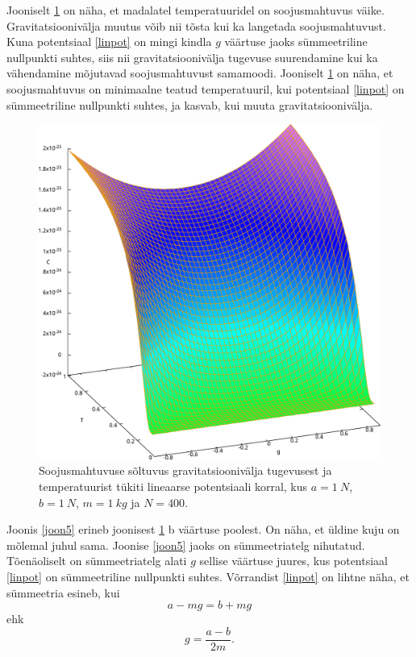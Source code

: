 \documentclass{trkut}%
\begin{document}
Jooniselt \ref{joon1} on näha, et madalatel temperatuuridel on soojusmahtuvus väike.
Gravitatsioonivälja muutus võib nii tõsta kui ka langetada soojusmahtuvust.
Kuna potentsiaal \eqref{linpot} on mingi kindla $g$ väärtuse jaoks sümmeetriline nullpunkti suhtes, siis nii gravitatsioonivälja tugevuse suurendamine kui ka vähendamine mõjutavad soojusmahtuvust samamoodi.
Jooniselt \ref{joon1} on näha, et soojusmahtuvus on minimaalne teatud temperatuuril, kui potentsiaal \eqref{linpot} on sümmeetriline nullpunkti suhtes, ja kasvab, kui muuta gravitatsioonivälja.

\begin{figure}[htb!]
    \includegraphics[width=\textwidth]{maxima/m1a1b1T0_1S400_2.pdf}
    \caption{Soojusmahtuvuse sõltuvus gravitatsioonivälja tugevusest ja temperatuurist tükiti lineaarse potentsiaali korral, kus $a=\SI{1}{N}$, $b=\SI{1}{N}$, $m=\SI{1}{kg}$ ja $N=400$.}
    \label{joon1}
\end{figure}

Joonis \ref{joon5} erineb joonisest \ref{joon1} b väärtuse poolest.
On näha, et üldine kuju on mõlemal juhul sama.
Joonise \ref{joon5} jaoks on sümmeetriatelg nihutatud.
Tõenäoliselt on sümmeetriatelg alati $g$ sellise väärtuse juures, kus potentsiaal \eqref{linpot} on sümmeetriline nullpunkti suhtes.
Võrrandist \eqref{linpot} on lihtne näha, et sümmeetria esineb, kui
\begin{equation}
    a-mg=b+mg
\end{equation}
ehk
\begin{equation}
    g=\frac{a-b}{2m}.
\end{equation}
\end{document}
